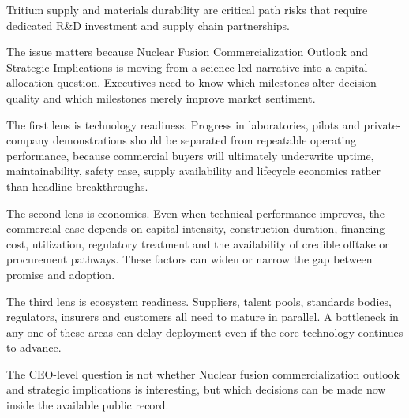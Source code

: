 \documentclass[10pt,a4paper]{article}
\begin{document}
\par\vspace{1pt}
{\small Tritium supply and materials durability are critical path risks that require dedicated R\&D investment and supply chain partnerships.}\par
{\small The issue matters because Nuclear Fusion Commercialization Outlook and Strategic Implications is moving from a science-led narrative into a capital-allocation question. Executives need to know which milestones alter decision quality and which milestones merely improve market sentiment.}\par
{\small The first lens is technology readiness. Progress in laboratories, pilots and private-company demonstrations should be separated from repeatable operating performance, because commercial buyers will ultimately underwrite uptime, maintainability, safety case, supply availability and lifecycle economics rather than headline breakthroughs.}\par
{\small The second lens is economics. Even when technical performance improves, the commercial case depends on capital intensity, construction duration, financing cost, utilization, regulatory treatment and the availability of credible offtake or procurement pathways. These factors can widen or narrow the gap between promise and adoption.}\par
{\small The third lens is ecosystem readiness. Suppliers, talent pools, standards bodies, regulators, insurers and customers all need to mature in parallel. A bottleneck in any one of these areas can delay deployment even if the core technology continues to advance.}\par
{}\par\vspace{1pt}
{\small The CEO-level question is not whether Nuclear fusion commercialization outlook and strategic implications is interesting, but which decisions can be made now inside the available public record.}\par
\label{chap:3:end}
\end{document}
